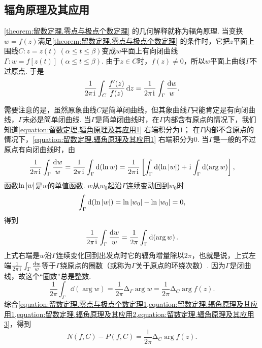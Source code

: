 \subsection{辐角原理及其应用}
\cref{theorem:留数定理.零点与极点个数定理} 的几何解释就称为辐角原理.
当变换\(w = f(z)\)满足\cref{theorem:留数定理.零点与极点个数定理} 的条件时，它把\(z\)平面上围线\(C: z = z(t)\ (\alpha \leq t \leq \beta)\)变成\(w\)平面上有向闭曲线\(\Gamma: w = f[z(t)]\ (\alpha \leq t \leq \beta)\).
由于\(z \in C\)时，\(f(z)\neq0\)，所以\(w\)平面上曲线\(\Gamma\)不过原点.
于是\begin{equation}\label{equation:留数定理.辐角原理及其应用1}
\frac{1}{2\pi\kern1pt\mathrm{i}\kern1pt} \int_C \frac{f'(z)}{f(z)} \dd{z}
= \frac{1}{2\pi\kern1pt\mathrm{i}\kern1pt} \int_\Gamma \frac{\dd{w}}{w}.
\end{equation}

需要注意的是，虽然原象曲线\(C\)是简单闭曲线，但其象曲线\(\Gamma\)只能肯定是有向闭曲线，\(\Gamma\)未必是简单闭曲线.
当\(\Gamma\)是简单闭曲线时，在\(\Gamma\)内部含有原点的情况下，我们知道\cref{equation:留数定理.辐角原理及其应用1} 右端积分为\(1\)；
在\(\Gamma\)内部不含原点的情况下，\cref{equation:留数定理.辐角原理及其应用1} 右端积分为\(0\).
当\(\Gamma\)是一般的不过原点有向闭曲线时，由\[
\frac{1}{2\pi\kern1pt\mathrm{i}\kern1pt} \int_\Gamma \frac{\dd{w}}{w}
= \frac{1}{2\pi\kern1pt\mathrm{i}\kern1pt} \int_\Gamma \dd(\ln w)
= \frac{1}{2\pi\kern1pt\mathrm{i}\kern1pt} \left[ \int_\Gamma \dd(\ln\abs{w}) + \kern1pt\mathrm{i}\kern1pt \int_\Gamma \dd(\arg w) \right],
\]函数\(\ln\abs{w}\)是\(w\)的单值函数.
\(w\)从\(w_0\)起沿\(\Gamma\)连续变动回到\(w_0\)时\[
\int_\Gamma \dd(\ln\abs{w})
= \ln\abs{w_0} - \ln\abs{w_0} = 0,
\]得到\begin{equation}\label{equation:留数定理.辐角原理及其应用2}
\frac{1}{2\pi\kern1pt\mathrm{i}\kern1pt} \int_\Gamma \frac{\dd{w}}{w}
= \frac{1}{2\pi} \int_\Gamma \dd(\arg w).
\end{equation}
上式右端是\(w\)沿\(\Gamma\)连续变化回到出发点时它的辐角增量除以\(2\pi\)，也就是说，上式左端\(\frac{1}{2\pi\kern1pt\mathrm{i}\kern1pt} \int_\Gamma \frac{\dd{w}}{w}\)等于\(\Gamma\)绕原点的圈数（或称为\(\Gamma\)关于原点的环绕次数）.
因为\(\Gamma\)是闭曲线，故这个“圈数”总是整数.
\begin{equation}\label{equation:留数定理.辐角原理及其应用3}
\frac{1}{2\pi} \int_\Gamma \dd(\arg w)
= \frac{1}{2\pi} \increment_\Gamma \arg w
= \frac{1}{2\pi} \increment_C \arg f(z).
\end{equation}
综合\cref{equation:留数定理.零点与极点个数定理1,equation:留数定理.辐角原理及其应用1,equation:留数定理.辐角原理及其应用2,equation:留数定理.辐角原理及其应用3}，得到\begin{equation}\label{equation:留数定理.辐角原理及其应用4}
N(f,C)-P(f,C) = \frac{1}{2\pi} \increment_C \arg f(z).
\end{equation}

